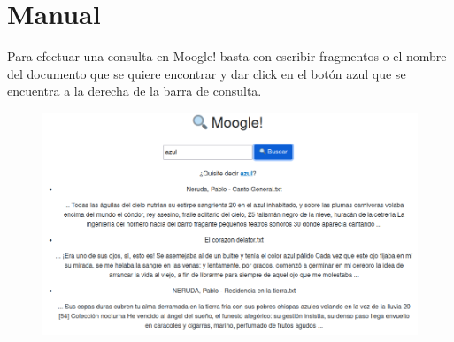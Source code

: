 \documentclass[12 pt]{article}
\begin{document}
 \section{Manual}
    Para efectuar una consulta en Moogle! basta con escribir
    fragmentos o el nombre del documento que se quiere encontrar y dar click en
    el botón azul que se encuentra a la derecha de la barra de consulta.\\
\begin{figure}[h]
    \includegraphics[width = 1.2 \linewidth]{ejemplo.png}
\end{figure}
\end{document}
